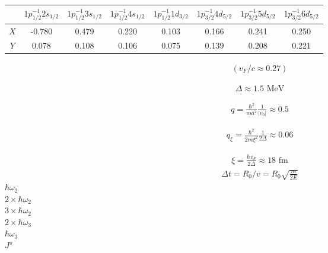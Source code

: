 \documentclass[a4paper,12pt]{book}
\numberwithin{equation}{section}
\numberwithin{figure}{section}
\numberwithin{table}{section}
\begin{document}
\begin{table}
\begin{tabular}{c|c|c|c|c|c|c|c}
		&$1p^{-1}_{1/2}2s_{1/2}$ &$1p^{-1}_{1/2}3s_{1/2}$  &$1p^{-1}_{1/2}4s_{1/2}$  &$1p^{-1}_{1/2}1d_{3/2}$  &$1p^{-1}_{3/2}4d_{5/2}$  &$1p^{-1}_{3/2}5d_{5/2}$ &$1p^{-1}_{3/2}6d_{5/2}$   \\
		\hline 
	$X$	& -0.780 &0.479  &0.220  &0.103  &0.166  &0.241  & 0.250 \\
	\hline
	$Y$	& 0.078 &0.108  &0.106  &0.075 &0.139  &0.208  & 0.221  
\end{tabular} 
\end{table}

\begin{align}\label{eq50}
(v_F/c\approx 0.27)
\end{align}

\begin{align}\label{eq50}
\Delta\approx 1.5\text{ MeV}
\end{align}

\begin{align}\label{eq50}
q=\frac{\hbar^2}{ma^2}\frac{1}{|v_0|}\approx 0.5
\end{align}


\begin{align}\label{eq50}
q_\xi=\frac{\hbar^2}{2m\xi^2}\frac{1}{2\Delta}\approx 0.06
\end{align}

\begin{align}\label{eq50}
\xi=\frac{\hbar v_F}{2\Delta}\approx 18\text{ fm}
\end{align}
\begin{align}\label{eq50}
\Delta t=R_0/v=R_0\sqrt{\frac{m}{2E}}
\end{align}
$\hbar\omega_2$\\ $2\times\hbar\omega_2$\\$3\times\hbar\omega_2$\\$2\times\hbar\omega_3$\\$\hbar\omega_3$\\
$J^\pi$
\end{document}
